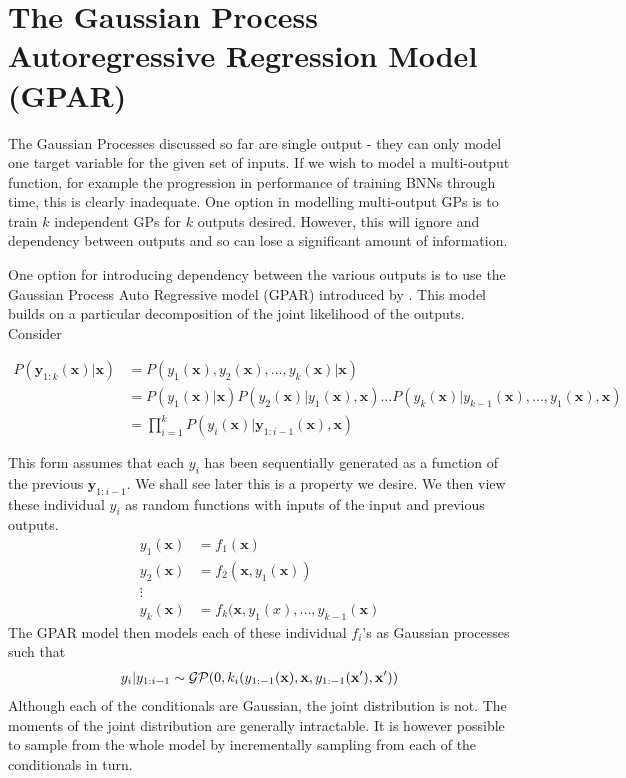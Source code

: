 \section{The Gaussian Process Autoregressive Regression Model (GPAR)}

The Gaussian Processes discussed so far are single output - they can only model one target variable for the given set of inputs. If we wish to model a multi-output function, for example the progression in performance of training BNNs through time, this is clearly inadequate. One option in modelling multi-output GPs is to train \( k \) independent GPs for \( k \) outputs desired. However, this will ignore and dependency between outputs and so can lose a significant amount of information.

One option for introducing dependency between the various outputs is to use the Gaussian Process Auto Regressive model (GPAR) introduced by \citet{Requeima2018}. This model builds on a particular decomposition of the joint likelihood of the outputs. Consider

\begin{align}
	P(\mathbf{y}_{1:k}(\mathbf{x})| \mathbf{x}) &= P(y_1(\mathbf{x}), y_2(\mathbf{x}), ..., y_k(\mathbf{x})|\mathbf{x})\\
	&= P(y_1(\mathbf{x}) | \mathbf{x}) P(y_2(\mathbf{x}) | y_1(\mathbf{x}), \mathbf{x}) ... P(y_k(\mathbf{x}) | y_{k-1}(\mathbf{x}), ..., y_1(\mathbf{x}), \mathbf{x})\\
	&= \prod_{i=1}^{k}P(y_i(\mathbf{x}) | \mathbf{y}_{1:i-1}(\mathbf{x}), \mathbf{x})
\end{align}

This form assumes that each \( y_i \) has been sequentially generated as a function of the previous \( \mathbf{y}_{1:i-1} \). We shall see later this is a property we desire. We then view these individual \( y_i \) as random functions with inputs of the input and previous outputs. 
\begin{align}
	y_1(\mathbf{x}) &= f_1(\mathbf{x})\\
	y_2(\mathbf{x}) &= f_2(\mathbf{x}, y_1(\mathbf{x}))\\
	\vdots\\
	y_k(\mathbf{x}) &= f_k(\mathbf{x}, y_1(x), ... ,y_{k-1}(\mathbf{x})
\end{align}
The GPAR model then models each of these individual \( f_i \)'s as Gaussian processes such that
\begin{align}
	y_i|y_{1:i-1} \sim \operatorname{\mathcal{GP}}(0, k_i(y_{1:-1}(\mathbf{x}), \mathbf{x}, y_{1:-1}(\mathbf{x}'), \mathbf{x}'))
\end{align}
Although each of the conditionals are Gaussian, the joint distribution is not. The moments of the joint distribution are generally intractable. It is however possible to sample from the whole model by incrementally sampling from each of the conditionals in turn.

